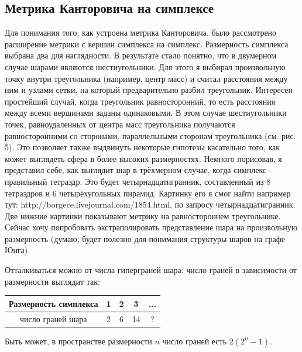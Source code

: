 \documentclass[12pt]{report}
\begin{document}
\subsection*{Метрика Канторовича на симплексе}

\hspace{\parindent} Для понимания того, как устроена метрика Канторовича, было рассмотрено расширение метрики с вершин симплекса на симплекс. Размерность симплекса выбрана два для наглядности. В результате стало понятно, что в двумерном случае шарами являются шестиугольники. Для этого я выбирал произвольную точку внутри треугольника (например, центр масс) и считал расстояния между ним и узлами сетки, на который предварительно разбил треугольник. Интересен простейший случай, когда треугольник равносторонний, то есть расстояния между всеми вершинами заданы одинаковыми. В этом случае шестиугольники точек, равноудаленных от центра масс треугольника получаются равносторонними со сторонами, параллельными сторонам треугольника (см. рис. 5). Это позволяет также выдвинуть некоторые гипотезы касательно того, как может выглядеть сфера в более высоких размерностях. Немного порисовав, я представил себе, как выглядит шар в трёхмерном случае, когда симплекс - правильный тетраэдр. Это будет четырнадцатигранник, составленный из 8 тетраэдров и 6 четырёхугольных пирамид. Картинку его я смог найти например тут: http://borgece.livejournal.com/1854.html, по запросу четырнадцатигранник. Две нижние картинки показывают метрику на равностороннем треугольнике.
Сейчас хочу попробовать экстраполировать представление шара на произвольную размерность (думаю, будет полезно для понимания структуры  шаров на графе Юнга).

Отталкиваться можно от числа гиперграней шара: число граней в зависимости от размерности выглядит так:

\begin{center}
\begin{tabular}{|c|c|c|c|c|}
\hline
Размерность симплекса & 1 & 2 & 3 & ...\\
\hline
число граней шара & 2 & 6 & 14 & ? \\
\hline
\end{tabular}
\end{center}

Быть может, в пространстве размерности $n$ число граней есть $2 (2^n - 1)$. 
\end{document}
